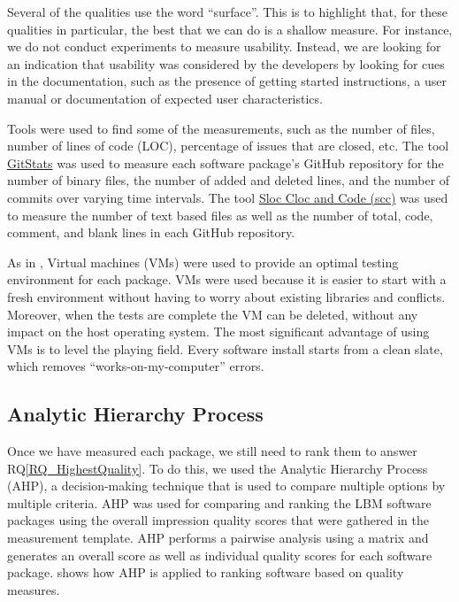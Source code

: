 \documentclass[final, 3p, times, authoryear]{elsarticle}
\newcommand{\rqref}[1]{RQ\ref{#1}}
\begin{document}
Several of the qualities use the word ``surface''.  This is to highlight that,
for these qualities in particular, the best that we can do is a shallow measure.
For instance, we do not conduct experiments to measure usability. Instead, we
are looking for an indication that usability was considered by the developers by
looking for cues in the documentation, such as the presence of getting started instructions, a user manual or documentation of expected user characteristics.

Tools were used to find some of the measurements, such as the number of files,
number of lines of code (LOC), percentage of issues that are closed, etc. The
tool \href{https://github.com/tomgi/git_stats}{GitStats} was used to measure
each software package's GitHub repository for the number of binary files, the
number of added and deleted lines, and the number of commits over varying time
intervals. The tool \href{https://github.com/boyter/scc}{Sloc Cloc and Code
(scc)} was used to measure the number of text based files as well as the number
of total, code, comment, and blank lines in each GitHub repository.

As in \citet{SmithEtAl2016}, Virtual machines (VMs) were used to provide an
optimal testing environment for each package. VMs were used because it is
easier to start with a fresh environment without having to worry about existing
libraries and conflicts. Moreover, when the tests are complete the VM can be
deleted, without any impact on the host operating system. The most significant
advantage of using VMs is to level the playing field. Every software install
starts from a clean slate, which removes ``works-on-my-computer'' errors.

\subsection{Analytic Hierarchy Process} \label{AHP}

Once we have measured each package, we still need to rank them to answer
\rqref{RQ_HighestQuality}.  To do this, we used the Analytic Hierarchy Process
(AHP), a decision-making technique that is used to compare multiple options by
multiple criteria. AHP was used for comparing and ranking the LBM software
packages using the overall impression quality scores that were gathered in the
measurement template.  AHP performs a pairwise analysis using a matrix and
generates an overall score as well as individual quality scores for each
software package. \citep{SmithEtAl2016} shows how AHP is applied to ranking
software based on quality measures. 
\end{document}
